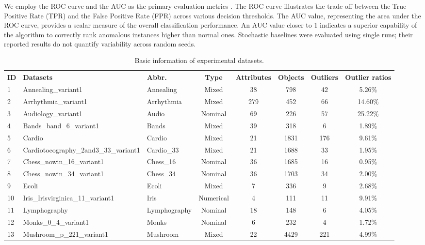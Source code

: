\documentclass[ASNA,twocolumn]{USG} %
\begin{document}
We employ the ROC curve and the AUC as the primary evaluation metrics \cite{campos2016evaluation}. The ROC curve illustrates the trade-off between the True Positive Rate (TPR) and the False Positive Rate (FPR) across various decision thresholds. The AUC value, representing the area under the ROC curve, provides a scalar measure of the overall classification performance. An AUC value closer to 1 indicates a superior capability of the algorithm to correctly rank anomalous instances higher than normal ones. Stochastic baselines were evaluated using single runs; their reported results do not quantify variability across random seeds.


\begin{table}[!ht]
	\caption{Basic information of experimental datasets.}\label{KSRA-DS}
    \centering
		\begin{tabular}{lllccccc}
			\toprule
			ID & Datasets & Abbr. & Type & Attributes & Objects & Outliers & Outlier ratios \\\midrule
            1 & Annealing\_variant1 & Annealing & Mixed & 38 & 798 & 42 & 5.26\% \\
            2 & Arrhythmia\_variant1 & Arrhythmia & Mixed & 279 & 452 & 66 & 14.60\% \\
            3 & Audiology\_variant1 & Audio & Nominal & 69 & 226 & 57 & 25.22\% \\
            4 & Bands\_band\_6\_variant1 & Bands & Mixed & 39 & 318 & 6 & 1.89\% \\
            5 & Cardio & Cardio & Mixed & 21 & 1831 & 176 & 9.61\% \\
            6 & Cardiotocography\_2and3\_33\_variant1 & Cardio\_33 & Mixed & 21 & 1688 & 33 & 1.95\% \\
            7 & Chess\_nowin\_16\_variant1 & Chess\_16 & Nominal & 36 & 1685 & 16 & 0.95\% \\
            8 & Chess\_nowin\_34\_variant1 & Chess\_34 & Nominal & 36 & 1703 & 34 & 2.00\% \\
            9 & Ecoli & Ecoli & Mixed & 7 & 336 & 9 & 2.68\% \\
            10 & Iris\_Irisvirginica\_11\_variant1 & Iris & Numerical & 4 & 111 & 11 & 9.91\% \\
            11 & Lymphography & Lymphography & Nominal & 18 & 148 & 6 & 4.05\% \\
            12 & Monks\_0\_4\_variant1 & Monks & Nominal & 6 & 232 & 4 & 1.72\% \\
            13 & Mushroom\_p\_221\_variant1 & Mushroom & Mixed & 22 & 4429 & 221 & 4.99\% \\

\end{tabular}
\end{table}
\end{document}
